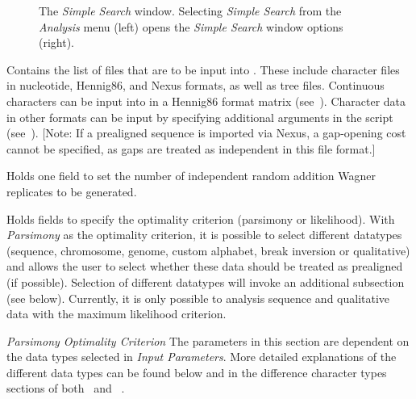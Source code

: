 \begin{figure}
\begin{minipage}[c]{0.52\textwidth}
   	\end{minipage}
	
\caption{The \emph{Simple Search} window. Selecting \emph{Simple Search} from the \emph{Analysis} 
menu (left) opens the \emph{Simple Search} window options (right).}
\label{fig:simple_search_window}
\end{figure}

\begin{description}
\setlength{\parindent}{0.5cm}
    \item[Input Files]
       	 Contains the list of files that are to be input into \poy. These include
       	character files in nucleotide, Hennig86, and Nexus formats, as well as tree files. 
	Continuous characters can be input into \poy in a Hennig86 format matrix (see~).
       	Character data in other formats can be input by specifying additional arguments in the script (see~).
		 [Note: If a prealigned sequence is imported via Nexus, a gap-opening cost cannot be specified, 
	 as gaps are treated as independent in this file format.]
    
    \item[Search Parameters]
        	Holds one field to set the number of independent random addition Wagner replicates to be generated.
    
    \item[Input Parameters]
    	Holds fields to specify the optimality criterion (parsimony or likelihood).  With \emph{Parsimony} 
	as the optimality criterion, it is possible to select different datatypes (sequence, chromosome, genome, 
	custom alphabet, break inversion or qualitative) and allows the user to select whether these data 
	should be treated as prealigned (if possible). Selection of different datatypes will invoke an additional 
	subsection (see below).  Currently, it is only possible to analysis sequence and qualitative data with 
	the maximum likelihood criterion.
\end{description}   

       \hangindent=1cm	\emph{Parsimony Optimality Criterion}
        The parameters in this section are dependent on the data types selected 
        in \emph{Input Parameters}. More detailed explanations of the different data types can be found 
        below and  in the difference character types sections of both~ and ~.

